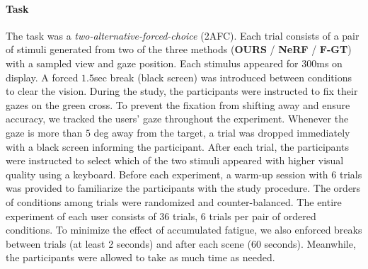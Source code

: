 \paragraph{Task}
The task was a \textit{two-alternative-forced-choice} (2AFC). Each trial consists of a pair of stimuli generated from two of the three methods ({\bf OURS} / {\bf NeRF} / {\bf F-GT}) with a sampled view and gaze position. Each stimulus appeared for $300$ms on display. A forced $1.5$sec break (black screen) was introduced between conditions to clear the vision. During the study, the participants were instructed to fix their gazes on the green cross. To prevent the fixation from shifting away and ensure accuracy, we tracked the users' gaze throughout the experiment. Whenever the gaze is more than $5$ deg away from the target, a trial was dropped immediately with a black screen informing the participant.
After each trial, the participants were instructed to select which of the two stimuli appeared with higher visual quality using a keyboard.
Before each experiment, a warm-up session with 6 trials was provided to familiarize the participants with the study procedure. The orders of conditions among trials were randomized and counter-balanced. The entire experiment of each user consists of $36$ trials, $6$ trials per pair of ordered conditions.
To minimize the effect of accumulated fatigue, we also enforced breaks between trials (at least 2 seconds) and after each scene (60 seconds). Meanwhile, the participants were allowed to take as much time as needed. 


